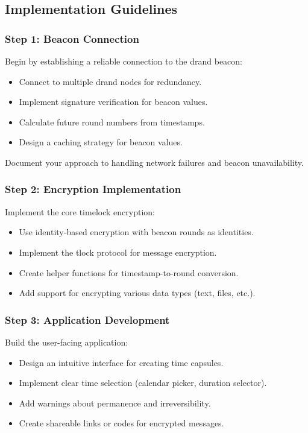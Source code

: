 \documentclass[10pt,a4paper,american]{exam}
\begin{document}
\subsection*{Implementation Guidelines}

\subsubsection*{Step 1: Beacon Connection}
Begin by establishing a reliable connection to the drand beacon:
\begin{itemize}
	\item Connect to multiple drand nodes for redundancy.
	\item Implement signature verification for beacon values.
	\item Calculate future round numbers from timestamps.
	\item Design a caching strategy for beacon values.
\end{itemize}

Document your approach to handling network failures and beacon unavailability.

\subsubsection*{Step 2: Encryption Implementation}
Implement the core timelock encryption:
\begin{itemize}
	\item Use identity-based encryption with beacon rounds as identities.
	\item Implement the tlock protocol for message encryption.
	\item Create helper functions for timestamp-to-round conversion.
	\item Add support for encrypting various data types (text, files, etc.).
\end{itemize}

\subsubsection*{Step 3: Application Development}
Build the user-facing application:
\begin{itemize}
	\item Design an intuitive interface for creating time capsules.
	\item Implement clear time selection (calendar picker, duration selector).
	\item Add warnings about permanence and irreversibility.
	\item Create shareable links or codes for encrypted messages.
\end{itemize}
\end{document}
